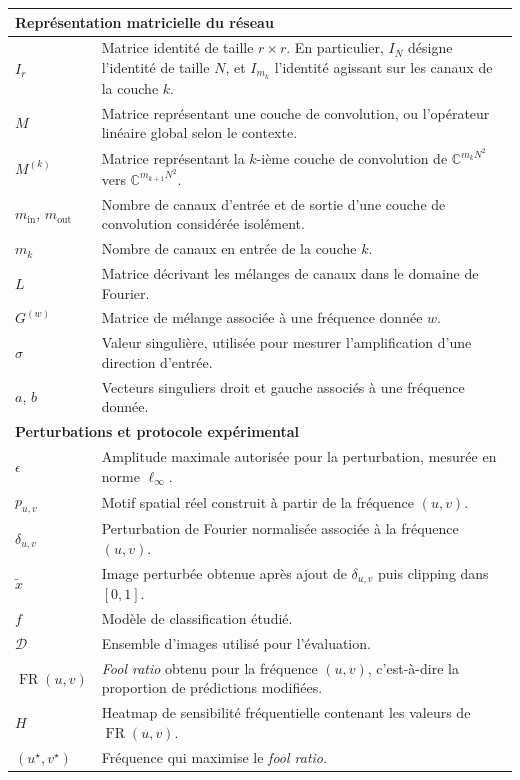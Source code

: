 \begin{longtable}{p{3cm} p{10.5cm}}
    \hline
    \multicolumn{2}{l}{\textbf{Représentation matricielle du réseau}} \\
    \hline
    $I_r$ & Matrice identité de taille $r \times r$. En particulier, $I_N$ désigne l'identité de taille $N$, et $I_{m_k}$ l'identité agissant sur les canaux de la couche $k$. \\
    $M$ & Matrice représentant une couche de convolution, ou l'opérateur linéaire global selon le contexte. \\
    $M^{(k)}$ & Matrice représentant la $k$-ième couche de convolution de $\mathbb{C}^{m_kN^2}$ vers $\mathbb{C}^{m_{k+1}N^2}$. \\
    $m_{\mathrm{in}}$, $m_{\mathrm{out}}$ & Nombre de canaux d'entrée et de sortie d'une couche de convolution considérée isolément. \\
    $m_k$ & Nombre de canaux en entrée de la couche $k$. \\
    $L$ & Matrice décrivant les mélanges de canaux dans le domaine de Fourier. \\
    $G^{(w)}$ & Matrice de mélange associée à une fréquence donnée $w$. \\
    $\sigma$ & Valeur singulière, utilisée pour mesurer l'amplification d'une direction d'entrée. \\
    $a$, $b$ & Vecteurs singuliers droit et gauche associés à une fréquence donnée. \\

    \hline
    \multicolumn{2}{l}{\textbf{Perturbations et protocole expérimental}} \\
    \hline
    $\epsilon$ & Amplitude maximale autorisée pour la perturbation, mesurée en norme $\ell_\infty$. \\
    $p_{u,v}$ & Motif spatial réel construit à partir de la fréquence $(u,v)$. \\
    $\delta_{u,v}$ & Perturbation de Fourier normalisée associée à la fréquence $(u,v)$. \\
    $\tilde{x}$ & Image perturbée obtenue après ajout de $\delta_{u,v}$ puis clipping dans $[0,1]$. \\
    $f$ & Modèle de classification étudié. \\
    $\mathcal{D}$ & Ensemble d'images utilisé pour l'évaluation. \\
    $\operatorname{FR}(u,v)$ & \textit{Fool ratio} obtenu pour la fréquence $(u,v)$, c'est-à-dire la proportion de prédictions modifiées. \\
    $H$ & Heatmap de sensibilité fréquentielle contenant les valeurs de $\operatorname{FR}(u,v)$. \\
    $(u^\star,v^\star)$ & Fréquence qui maximise le \textit{fool ratio}. \\

    \hline
\end{longtable}

\normalsize